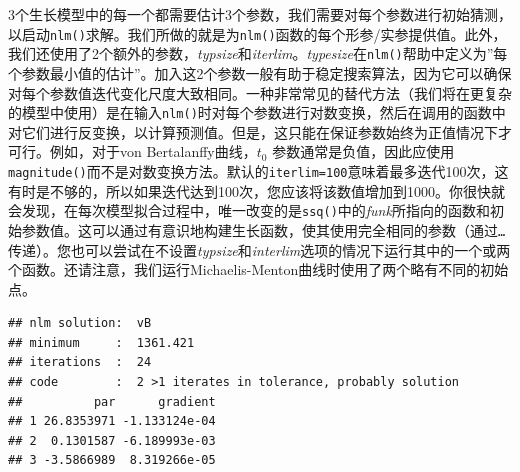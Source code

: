 \documentclass[
  lang=cn,
  11pt,
  scheme=chinese,
  chinesefont=nofont,
  citestyle=gb7714-2015,
  bibstyle=gb7714-2015]{elegantbook}
\newenvironment{Shaded}{\begin{snugshade}}{\end{snugshade}}
\newcommand{\AttributeTok}[1]{\textcolor[rgb]{0.13,0.29,0.53}{#1}}
\newcommand{\CommentTok}[1]{\textcolor[rgb]{0.56,0.35,0.01}{\textit{#1}}}
\newcommand{\ConstantTok}[1]{\textcolor[rgb]{0.56,0.35,0.01}{#1}}
\newcommand{\DecValTok}[1]{\textcolor[rgb]{0.00,0.00,0.81}{#1}}
\newcommand{\FloatTok}[1]{\textcolor[rgb]{0.00,0.00,0.81}{#1}}
\newcommand{\FunctionTok}[1]{\textcolor[rgb]{0.13,0.29,0.53}{\textbf{#1}}}
\newcommand{\NormalTok}[1]{#1}
\newcommand{\OtherTok}[1]{\textcolor[rgb]{0.56,0.35,0.01}{#1}}
\newcommand{\SpecialCharTok}[1]{\textcolor[rgb]{0.81,0.36,0.00}{\textbf{#1}}}
\newcommand{\StringTok}[1]{\textcolor[rgb]{0.31,0.60,0.02}{#1}}
\begin{document}
3个生长模型中的每一个都需要估计3个参数，我们需要对每个参数进行初始猜测，以启动\texttt{nlm()}求解。我们所做的就是为\texttt{nlm()}函数的每个形参/实参提供值。此外，我们还使用了2个额外的参数，\emph{typsize}和\emph{iterlim}。\emph{typesize}在\texttt{nlm()}帮助中定义为''每个参数最小值的估计''。加入这2个参数一般有助于稳定搜索算法，因为它可以确保对每个参数值迭代变化尺度大致相同。一种非常常见的替代方法（我们将在更复杂的模型中使用）是在输入\texttt{nlm()}时对每个参数进行对数变换，然后在调用的函数中对它们进行反变换，以计算预测值。但是，这只能在保证参数始终为正值情况下才可行。例如，对于von Bertalanffy曲线，\(t_0\) 参数通常是负值，因此应使用\texttt{magnitude()}而不是对数变换方法。默认的\texttt{iterlim=100}意味着最多迭代100次，这有时是不够的，所以如果迭代达到100次，您应该将该数值增加到1000。你很快就会发现，在每次模型拟合过程中，唯一改变的是\texttt{ssq()}中的\emph{funk}所指向的函数和初始参数值。这可以通过有意识地构建生长函数，使其使用完全相同的参数（通过\texttt{…}传递）。您也可以尝试在不设置\emph{typsize}和\emph{interlim}选项的情况下运行其中的一个或两个函数。还请注意，我们运行Michaelis-Menton曲线时使用了两个略有不同的初始点。

\begin{Shaded}
\end{Shaded}

\begin{verbatim}
## nlm solution:  vB 
## minimum     :  1361.421 
## iterations  :  24 
## code        :  2 >1 iterates in tolerance, probably solution 
##          par      gradient
## 1 26.8353971 -1.133124e-04
## 2  0.1301587 -6.189993e-03
## 3 -3.5866989  8.319266e-05
\end{verbatim}
\end{document}
